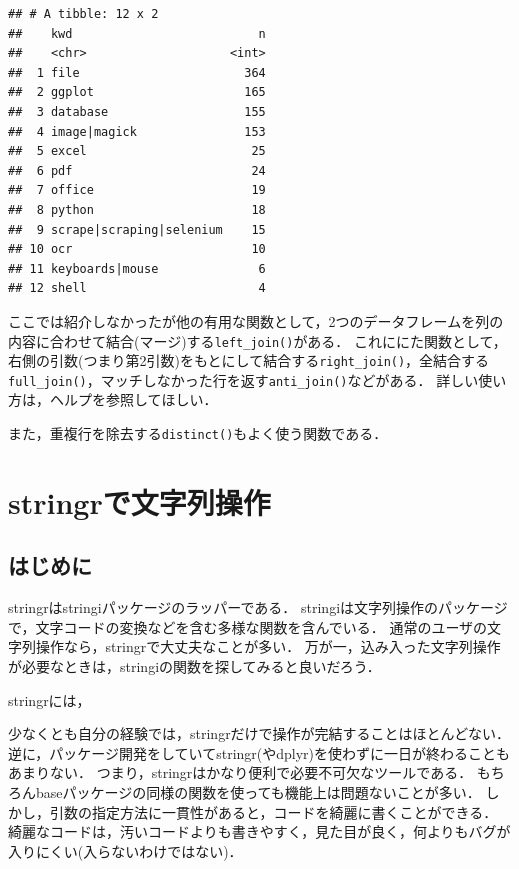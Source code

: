 \documentclass[
]{article}
\begin{document}
\begin{verbatim}
## # A tibble: 12 x 2
##    kwd                          n
##    <chr>                    <int>
##  1 file                       364
##  2 ggplot                     165
##  3 database                   155
##  4 image|magick               153
##  5 excel                       25
##  6 pdf                         24
##  7 office                      19
##  8 python                      18
##  9 scrape|scraping|selenium    15
## 10 ocr                         10
## 11 keyboards|mouse              6
## 12 shell                        4
\end{verbatim}

ここでは紹介しなかったが他の有用な関数として，2つのデータフレームを列の内容に合わせて結合(マージ)する\texttt{left\_join()}がある．
これににた関数として，右側の引数(つまり第2引数)をもとにして結合する\texttt{right\_join()}，全結合する\texttt{full\_join()}，マッチしなかった行を返す\texttt{anti\_join()}などがある．
詳しい使い方は，ヘルプを参照してほしい．

また，重複行を除去する\texttt{distinct()}もよく使う関数である．

\hypertarget{stringr}{%
\section{stringrで文字列操作}\label{stringr}}

\hypertarget{ux306fux3058ux3081ux306b-1}{%
\subsection{はじめに}\label{ux306fux3058ux3081ux306b-1}}

stringrはstringiパッケージのラッパーである．
stringiは文字列操作のパッケージで，文字コードの変換などを含む多様な関数を含んでいる．
通常のユーザの文字列操作なら，stringrで大丈夫なことが多い．
万が一，込み入った文字列操作が必要なときは，stringiの関数を探してみると良いだろう．

stringrには，

少なくとも自分の経験では，stringrだけで操作が完結することはほとんどない．
逆に，パッケージ開発をしていてstringr(やdplyr)を使わずに一日が終わることもあまりない．
つまり，stringrはかなり便利で必要不可欠なツールである．
もちろんbaseパッケージの同様の関数を使っても機能上は問題ないことが多い．
しかし，引数の指定方法に一貫性があると，コードを綺麗に書くことができる．
綺麗なコードは，汚いコードよりも書きやすく，見た目が良く，何よりもバグが入りにくい(入らないわけではない)．
\end{document}
